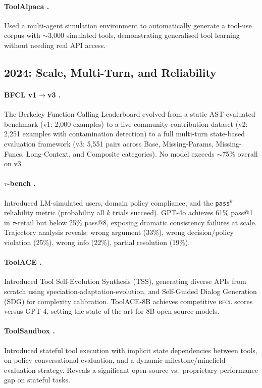 \documentclass[11pt]{article}
\newcommand{\taubench}{$\tau$-bench}
\newcommand{\bfcl}{\textsc{bfcl}}
\begin{document}
\paragraph{ToolAlpaca \citep{tang2023toolalpaca}.}
Used a multi-agent simulation environment to automatically generate a tool-use corpus with
$\sim$3,000 simulated tools, demonstrating generalised tool learning without needing real API access.

\subsection{2024: Scale, Multi-Turn, and Reliability}

\paragraph{BFCL v1$\rightarrow$v3 \citep{patil2025bfcl}.}
The Berkeley Function Calling Leaderboard evolved from a static AST-evaluated benchmark
(v1: 2,000 examples) to a live community-contribution dataset (v2: 2,251 examples with
contamination detection) to a full multi-turn state-based evaluation framework (v3: 5,551 pairs
across Base, Missing-Params, Missing-Funcs, Long-Context, and Composite categories). No model
exceeds $\sim$75\% overall on v3.

\paragraph{\taubench{} \citep{yao2024taubench}.}
Introduced LM-simulated users, domain policy compliance, and the \texttt{pass}$^k$ reliability
metric (probability all $k$ trials succeed). GPT-4o achieves 61\% pass@1 in $\tau$-retail but
below 25\% pass@8, exposing dramatic consistency failures at scale. Trajectory analysis reveals:
wrong argument (33\%), wrong decision/policy violation (25\%), wrong info (22\%), partial
resolution (19\%).

\paragraph{ToolACE \citep{liu2025toolace}.}
Introduced Tool Self-Evolution Synthesis (TSS), generating diverse APIs from scratch using
speciation-adaptation-evolution, and Self-Guided Dialog Generation (SDG) for complexity
calibration. ToolACE-8B achieves competitive \bfcl{} scores versus GPT-4, setting the state of
the art for 8B open-source models.

\paragraph{ToolSandbox \citep{lu2025toolsandbox}.}
Introduced stateful tool execution with implicit state dependencies between tools, on-policy
conversational evaluation, and a dynamic milestone/minefield evaluation strategy. Reveals a
significant open-source vs.\ proprietary performance gap on stateful tasks.
\end{document}
